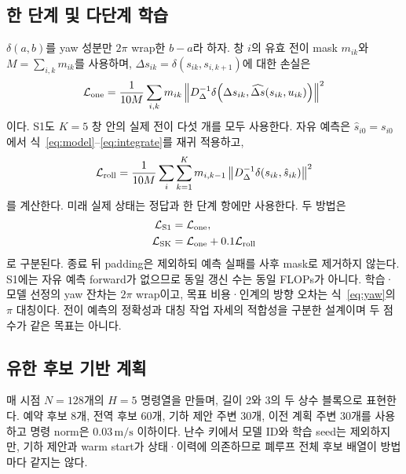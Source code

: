 \documentclass[conference,a4paper]{IEEEtran}
\newcommand{\norm}[1]{\left\lVert#1\right\rVert}
\begin{document}
\subsection{한 단계 및 다단계 학습}
$\delta(a,b)$를 yaw 성분만 $2\pi$ wrap한 $b-a$라 하자.
창 $i$의 유효 전이 mask $m_{ik}$와 $M=\sum_{i,k}m_{ik}$를 사용하며,
$\Delta s_{ik}=\delta(s_{ik},s_{i,k+1})$에 대한 손실은
\begin{equation}
\mathcal L_{\rm one}=
\frac{1}{10M}\sum_{i,k}m_{ik}
\norm{D_\Delta^{-1}\delta\!\left(
\Delta s_{ik},\widehat{\Delta s}(s_{ik},u_{ik})\right)}^2
\label{eq:one}
\end{equation}
이다.
S1도 $K=5$ 창 안의 실제 전이 다섯 개를 모두 사용한다.
자유 예측은 $\hat s_{i0}=s_{i0}$에서 식~\eqref{eq:model}--\eqref{eq:integrate}를 재귀 적용하고,
\begin{equation}
\mathcal L_{\rm roll}=
\frac{1}{10M}\sum_i\sum_{k=1}^{K}m_{i,k-1}
\norm{D_\Delta^{-1}\delta(s_{ik},\hat s_{ik})}^2
\label{eq:roll}
\end{equation}
를 계산한다.
미래 실제 상태는 정답과 한 단계 항에만 사용한다.
두 방법은
\begin{align}
\mathcal L_{\rm S1}&=\mathcal L_{\rm one},\nonumber\\
\mathcal L_{\rm SK}&=\mathcal L_{\rm one}+0.1\mathcal L_{\rm roll}
\label{eq:objectives}
\end{align}
로 구분된다.
종료 뒤 padding은 제외하되 예측 실패를 사후 mask로 제거하지 않는다.
S1에는 자유 예측 forward가 없으므로 동일 갱신 수는 동일 FLOPs가 아니다.
학습·모델 선정의 yaw 잔차는 $2\pi$ wrap이고, 목표 비용·인계의 방향 오차는 식~\eqref{eq:yaw}의 $\pi$ 대칭이다.
전이 예측의 정확성과 대칭 작업 자세의 적합성을 구분한 설계이며 두 점수가 같은 목표는 아니다.

\subsection{유한 후보 기반 계획}
매 시점 $N=128$개의 $H=5$ 명령열을 만들며, 길이 2와 3의 두 상수 블록으로 표현한다.
예약 후보 8개, 전역 후보 60개, 기하 제안 주변 30개, 이전 계획 주변 30개를 사용하고 명령 norm은 $0.03\,\mathrm{m/s}$ 이하이다.
난수 키에서 모델 ID와 학습 seed는 제외하지만, 기하 제안과 warm start가 상태·이력에 의존하므로 폐루프 전체 후보 배열이 방법마다 같지는 않다.
\end{document}
